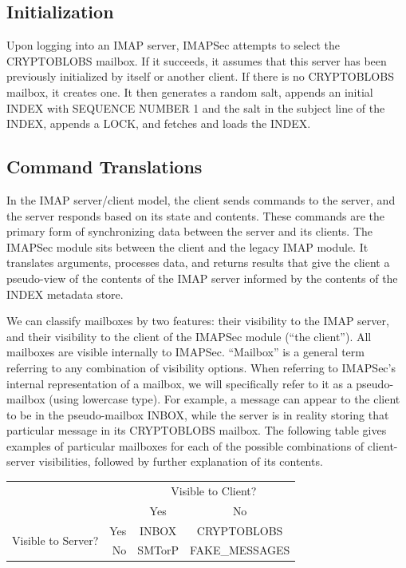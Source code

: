 \documentclass[pageno]{jpaper}
\newcommand{\project}{IMAPSec }
\newcommand{\projectnospace}{IMAPSec}
\begin{document}
\subsection{Initialization}
\label{initialization}

Upon logging into an IMAP server, \project attempts to select the CRYPTOBLOBS mailbox. If it succeeds, it assumes that this server has been previously initialized by itself or another client. If there is no CRYPTOBLOBS mailbox, it creates one. It then generates a random salt, appends an initial INDEX with SEQUENCE NUMBER 1 and the salt in the subject line of the INDEX, appends a LOCK, and fetches and loads the INDEX.

\subsection{Command Translations}
In the IMAP server/client model, the client sends commands to the server, and the server responds based on its state and contents. These commands are the primary form of synchronizing data between the server and its clients. The \project module sits between the client and the legacy IMAP module. It translates arguments, processes data, and returns results that give the client a pseudo-view of the contents of the IMAP server informed by the contents of the INDEX metadata store.

We can classify mailboxes by two features: their visibility to the IMAP server, and their visibility to the client of the \project module (``the client''). All mailboxes are visible internally to \projectnospace. ``Mailbox'' is a general term referring to any combination of visibility options. When referring to \projectnospace's internal representation of a mailbox, we will specifically refer to it as a pseudo-mailbox (using lowercase type). For example, a message can appear to the client to be in the pseudo-mailbox INBOX, while the server is in reality storing that particular message in its CRYPTOBLOBS mailbox. The following table gives examples of particular mailboxes for each of the possible combinations of client-server visibilities, followed by further explanation of its contents.

\begin{center}
\begin{tabular}{ rr|c|c| }

 &\multicolumn{1}{r}{} & \multicolumn{2}{c}{Visible to Client?} \\

&\multicolumn{1}{r}{}
 &  \multicolumn{1}{c}{Yes}
 & \multicolumn{1}{c}{No} \\
\cline{3-4}
\multirow{2}{*}{Visible to Server?} & Yes & INBOX & CRYPTOBLOBS \\
\cline{3-4}
& No & SMTorP & FAKE\_MESSAGES \\
\cline{3-4}
\end{tabular}
\end{center}
\end{document}
